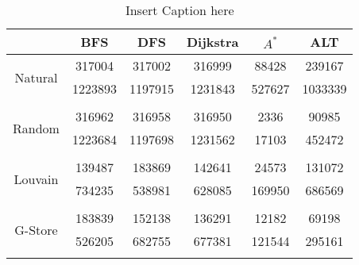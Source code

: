 \begin{table}
	\begin{center}
		 \begin{tabular}[c]{c c c c c c} \toprule
			  & BFS & DFS & Dijkstra & $A^*$  & ALT \\ \midrule 
 			\multirow{2}{*}{Natural}  & 317004 & 317002 & 316999 & 88428 & 239167 \\ 
 				 & 1223893 & 1197915 & 1231843 & 527627 & 1033339 \\ 
 				&&&&& \\[-0.5em]
 			\multirow{2}{*}{Random}  & 316962 & 316958 & 316950 & 2336 & 90985 \\ 
 				 & 1223684 & 1197698 & 1231562 & 17103 & 452472 \\ 
 				&&&&& \\[-0.5em]
 			\multirow{2}{*}{Louvain}  & 139487 & 183869 & 142641 & 24573 & 131072 \\ 
 				 & 734235 & 538981 & 628085 & 169950 & 686569 \\ 
 				&&&&& \\[-0.5em]
 			\multirow{2}{*}{G-Store}  & 183839 & 152138 & 136291 & 12182 & 69198 \\ 
 				 & 526205 & 682755 & 677381 & 121544 & 295161 \\ 
 				&&&&& \\[-0.5em]
 					\end{tabular}  
  	 \end{center}
	 \caption{ Insert Caption here}
\end{table}